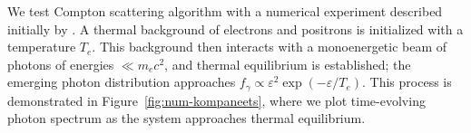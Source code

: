 \begin{figure}[htb]
\end{figure}

We test Compton scattering algorithm with a numerical experiment described initially by \cite{1957JETP....4..730K}. A thermal background of electrons and positrons is initialized with a temperature $T_e$. This background then interacts with a monoenergetic beam of photons of energies $\ll m_e c^2$, and thermal equilibrium is established; the emerging photon distribution approaches $f_\gamma \propto \varepsilon^2\exp{(-\varepsilon/T_e)}$. This process is demonstrated in Figure~\ref{fig:num-kompaneets}, where we plot time-evolving photon spectrum as the system approaches thermal equilibrium.

